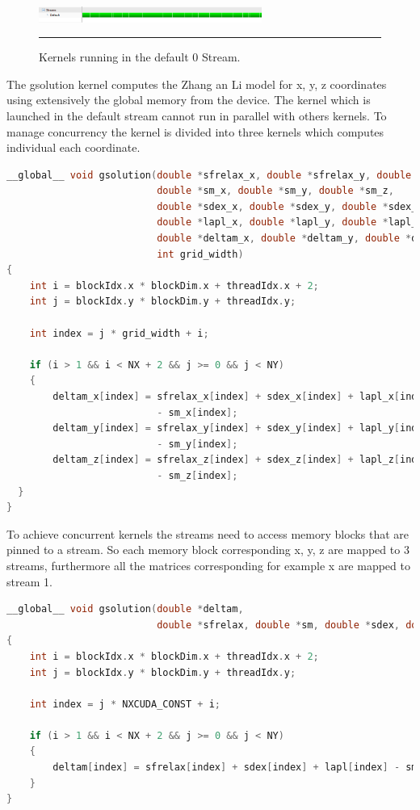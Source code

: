 \begin{figure}[htbp]
	\centering
		\includegraphics[width=0.65\textwidth]{Figures/ini_steams.png}
		\rule{35em}{0.2pt}
	\caption[Initial Streams]{Kernels running in the default 0 Stream.
}
	\label{fig:streams}
\end{figure}


The gsolution kernel computes the Zhang an Li model for x, y, z coordinates using extensively the global memory from the device. The kernel which is launched in the default stream cannot run in parallel with others kernels. To manage concurrency the kernel is divided into three kernels which computes individual each coordinate. 

\begin{lstlisting}[language=C++, caption={Evaluation of x, y, z coordinates of the Zhang and Li model in a single kernel}]
__global__ void gsolution(double *sfrelax_x, double *sfrelax_y, double *sfrelax_z,
                          double *sm_x, double *sm_y, double *sm_z,
                          double *sdex_x, double *sdex_y, double *sdex_z,
                          double *lapl_x, double *lapl_y, double *lapl_z,
                          double *deltam_x, double *deltam_y, double *deltam_z,
                          int grid_width)
{
	int i = blockIdx.x * blockDim.x + threadIdx.x + 2;
  	int j = blockIdx.y * blockDim.y + threadIdx.y;
    
  	int index = j * grid_width + i;

  	if (i > 1 && i < NX + 2 && j >= 0 && j < NY)
  	{
  		deltam_x[index] = sfrelax_x[index] + sdex_x[index] + lapl_x[index]
                          - sm_x[index];
     	deltam_y[index] = sfrelax_y[index] + sdex_y[index] + lapl_y[index]
                          - sm_y[index];
     	deltam_z[index] = sfrelax_z[index] + sdex_z[index] + lapl_z[index]
                          - sm_z[index];
  }
}
\end{lstlisting}

To achieve concurrent kernels the streams need to access memory blocks that are pinned to a stream. So each memory block corresponding x, y, z are mapped to 3 streams, furthermore all the matrices corresponding for example x are mapped to stream 1. 


\begin{lstlisting}[language=C++, caption={Evaluation of individual coordinates of the Zhang and Li model}]
__global__ void gsolution(double *deltam,
					      double *sfrelax, double *sm, double *sdex, double *lapl)
{
    int i = blockIdx.x * blockDim.x + threadIdx.x + 2;
    int j = blockIdx.y * blockDim.y + threadIdx.y;
 
    int index = j * NXCUDA_CONST + i;

    if (i > 1 && i < NX + 2 && j >= 0 && j < NY)
    {
        deltam[index] = sfrelax[index] + sdex[index] + lapl[index] - sm[index];
    }
}
\end{lstlisting}


